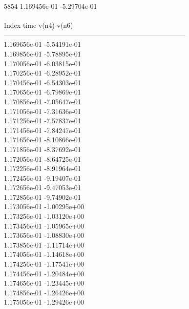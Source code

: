 5854	1.169456e-01	-5.29704e-01	\\ \hline
\\ \hline
Index   time            v(n4)-v(n6)     \\ \hline
--------------------------------------------------------------------------------\\ 	1.169656e-01	-5.54191e-01	\\ 	1.169856e-01	-5.78895e-01	\\ 	1.170056e-01	-6.03815e-01	\\ 	1.170256e-01	-6.28952e-01	\\ 	1.170456e-01	-6.54303e-01	\\ 	1.170656e-01	-6.79869e-01	\\ 	1.170856e-01	-7.05647e-01	\\ 	1.171056e-01	-7.31636e-01	\\ 	1.171256e-01	-7.57837e-01	\\ 	1.171456e-01	-7.84247e-01	\\ 	1.171656e-01	-8.10866e-01	\\ 	1.171856e-01	-8.37692e-01	\\ 	1.172056e-01	-8.64725e-01	\\ 	1.172256e-01	-8.91964e-01	\\ 	1.172456e-01	-9.19407e-01	\\ 	1.172656e-01	-9.47053e-01	\\ 	1.172856e-01	-9.74902e-01	\\ 	1.173056e-01	-1.00295e+00	\\ 	1.173256e-01	-1.03120e+00	\\ 	1.173456e-01	-1.05965e+00	\\ 	1.173656e-01	-1.08830e+00	\\ 	1.173856e-01	-1.11714e+00	\\ 	1.174056e-01	-1.14618e+00	\\ 	1.174256e-01	-1.17541e+00	\\ 	1.174456e-01	-1.20484e+00	\\ 	1.174656e-01	-1.23445e+00	\\ 	1.174856e-01	-1.26426e+00	\\ 	1.175056e-01	-1.29426e+00	\\ \hline

